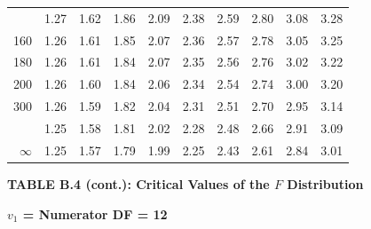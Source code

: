 \documentclass[10pt]{article}
\begin{document}
\begin{longtable}{@{}r!{\vrule width 0.8pt\hspace{0.55em}}rrrrrrrrr@{}}
 & 1.27 & 1.62 & 1.86 & 2.09 & 2.38 & 2.59 & 2.80 & 3.08 & 3.28 \\
160 & 1.26 & 1.61 & 1.85 & 2.07 & 2.36 & 2.57 & 2.78 & 3.05 & 3.25 \\
180 & 1.26 & 1.61 & 1.84 & 2.07 & 2.35 & 2.56 & 2.76 & 3.02 & 3.22 \\
200 & 1.26 & 1.60 & 1.84 & 2.06 & 2.34 & 2.54 & 2.74 & 3.00 & 3.20 \\
300 & 1.26 & 1.59 & 1.82 & 2.04 & 2.31 & 2.51 & 2.70 & 2.95 & 3.14 \\
 & 1.25 & 1.58 & 1.81 & 2.02 & 2.28 & 2.48 & 2.66 & 2.91 & 3.09 \\
$\infty$ & 1.25 & 1.57 & 1.79 & 1.99 & 2.25 & 2.43 & 2.61 & 2.84 & 3.01 \\
\end{longtable}
\newpage
\thispagestyle{empty}
\begin{center}
{\large\bfseries TABLE B.4 (cont.): Critical Values of the $F$ Distribution\par}
\end{center}
{\large\bfseries $v_1$ = Numerator DF = 12\par}
\vspace{0.5em}
\small
\end{document}
